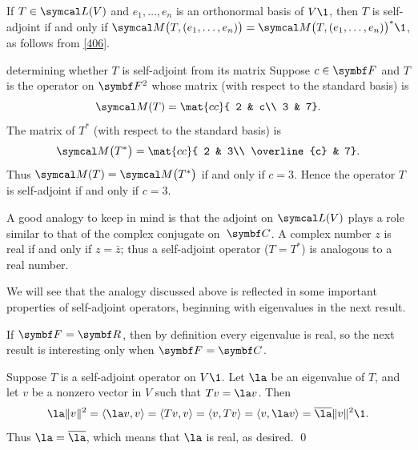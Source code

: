 {  \addtolength{\abovedisplayskip}{-.035in} \addtolength{\abovedisplayshortskip}{-.035in} \addtolength{\belowdisplayskip}{-.035in}
\addtolength{\belowdisplayshortskip}{-.035in} %


If $T \in \L(V)$ and $e_1, \ldots, e_n$ is an orthonormal basis of $V\1$, then $T$ is self-adjoint if and only if
$\M\paren[\big]{ T, (e_1, \ldots, e_n) } = \M\paren[\big]{ T, (e_1, \ldots, e_n) }^*\1$, as follows from \ref{406}.

\begin{example}{determining whether\/ $T$ is self-adjoint from its matrix}
Suppose $c \in \F{}$ and $T$ is the operator on $\F{2}$ whose matrix (with respect to the standard basis) is
\[
\M(T) = \mat{cc}{
2 & c\\
3 & 7}.
\]
The matrix of $T^*$ (with respect to the standard basis) is
\[
\M\paren[\big]{T^*} = \mat{cc}{
2 & 3\\
\overline{c} & 7}.
\]
Thus $\M(T) = \M\paren[\big]{T^*}$ if and only if $c = 3$. Hence the operator $T$ is self-adjoint if and only if $c = 3$.
\end{example}


A good analogy to keep in mind is that the adjoint on $\L(V)$ plays a role similar to that of the complex  conjugate on~$\C{}$. A complex number $z$ is real if and only if $z = \bar{z}$; thus a self-adjoint operator ($T = T^*$) is analogous to a real number.


We will see  that the analogy discussed above is reflected in some
important properties of self-adjoint operators, beginning with eigenvalues in the next result.

If $\F{} = \R{}$, then by definition every eigenvalue is real, so the next result is interesting only when\/ $\F{} = \C{}$.


\proof
Suppose $T$ is a self-adjoint operator on $V\1$. Let $\la$ be an eigenvalue of $T$,
and let $v$ be a nonzero vector in $V$ such that $Tv = \la v$.  Then
\[
\la \| v \|^2 = \ip{\la v, v}
= \ip{Tv, v}
= \ip{v, Tv}
= \ip{v, \la v}
= \bar{\la} \| v \|^2\1.
\]
Thus $\la = \bar{\la}$, which means that $\la$ is real, as desired.
\qed

} %

